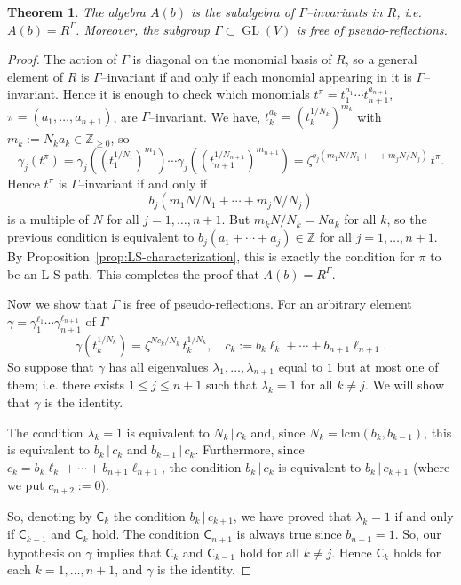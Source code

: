 \documentclass[10pt,a4paper]{amsart}
\newtheorem{theorem}{Theorem}
\DeclareMathOperator{\GL}{GL}
\newcommand{\ZZ}{\mathbb{Z}}
\begin{document}
\begin{theorem}\label{thm:invariant-ring-Gamma}
The algebra $A(b)$ is the subalgebra of $\Gamma$--invariants in $ R$, i.e. $A(b) =  R^{\Gamma}$. Moreover, the subgroup $\Gamma \subset \GL( V)$ is free of pseudo-reflections.
\end{theorem}

\begin{proof}
The action of $\Gamma$ is diagonal on the monomial basis of $R$, so a general element of $R$ is $\Gamma$--invariant if and only if each monomial appearing in it is $\Gamma$--invariant. Hence it is enough to check which monomials $t^\pi = t_1^{a_1}\cdots t_{n+1}^{a_{n+1}}$, $\pi = (a_1, \ldots,a_{n+1})$, are $\Gamma$--invariant.
We have, $t_k^{a_k} = (t_k^{1/N_k})^{m_k}$ with $m_k := N_k a_k \in \ZZ_{\ge 0}$, so
\[
\gamma_j(t^\pi) = \gamma_j((t_1^{1/N_1})^{m_1})\cdots \gamma_j((t_{n+1}^{1/N_{n+1}})^{m_{n+1}}) = \zeta^{b_j(m_1N/N_1 + \cdots + m_jN/N_j)}\, t^\pi.
\]
Hence $t^\pi$ is $\Gamma$--invariant if and only if
\[
b_j(m_1N/N_1 + \cdots + m_jN/N_j)
\]
is a multiple of $N$ for all $j = 1, \ldots, n+1$. But $m_kN/N_k = N a_k$ for all $k$, so the previous condition is equivalent to $b_j(a_1 + \cdots + a_j) \in \ZZ$ for all $j = 1, \ldots, n+1$. By Proposition~\ref{prop:LS-characterization}, this is exactly the condition for $\pi$ to be an L-S path. This completes the proof that $A(b) =  R^{\Gamma}$.

Now we show that $\Gamma$ is free of pseudo-reflections. For an arbitrary element $\gamma = \gamma_1^{\ell_1}\cdots \gamma_{n+1}^{\ell_{n+1}}$ of $\Gamma$
\[
\gamma(t_k^{1/N_k}) = \zeta^{N c_k /N_k}\, t_k^{1/N_k},\quad c_k := b_k \ell_k + \cdots + b_{n+1} \ell_{n+1}.
\]
So suppose that $\gamma$ has all eigenvalues $\lambda_1, \ldots, \lambda_{n+1}$ equal to $1$ but at most one of them; i.e. there exists $1\leq j\leq n+1$ such that $\lambda_k = 1$ for all $k\neq j$. We will show that $\gamma$ is the identity.

The condition $\lambda_k = 1$ is equivalent to $N_k\,|\,c_k$ and, since $N_k = \mathrm{lcm}(b_k,b_{k-1})$, this is equivalent to $b_k\,|\,c_k$ and $b_{k - 1}\,|\,c_k$. Furthermore, since $c_k = b_k\ell_k + \cdots + b_{n+1}\ell_{n+1}$, the condition $b_k\,|\,c_k$ is equivalent to $b_k\,|\,c_{k+1}$ (where we put $c_{n+2} := 0$).

So, denoting by ${\mathsf C}_k$ the condition $b_k\,|\,c_{k+1}$, we have proved that $\lambda_k = 1$ if and only if ${\mathsf C}_{k-1}$ and ${\mathsf C}_k$ hold. The condition ${\mathsf C}_{n+1}$ is always true since $b_{n+1} = 1$. So, our hypothesis on $\gamma$ implies that ${\mathsf C}_k$ and ${\mathsf C}_{k-1}$ hold for all $k\neq j$. Hence ${\mathsf C}_k$ holds for each $k=1,\ldots,n+1$, and $\gamma$ is the identity.
\end{proof}
\end{document}
